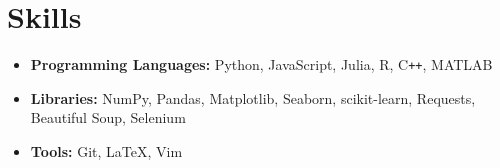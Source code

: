 \documentclass[letterpaper,11pt]{article}
\begin{document}
\section{Skills}
    \begin{itemize}
        
        \item \textbf{Programming Languages:} 
        Python, JavaScript, Julia, 
        R, 
        C\texttt{++}, 
        MATLAB
        
        \item \textbf{Libraries:} NumPy, Pandas, Matplotlib, Seaborn,  scikit-learn, 
        Requests, Beautiful Soup, Selenium

        \item \textbf{Tools:} Git, \LaTeX, Vim
        
    \end{itemize}


\end{document}
